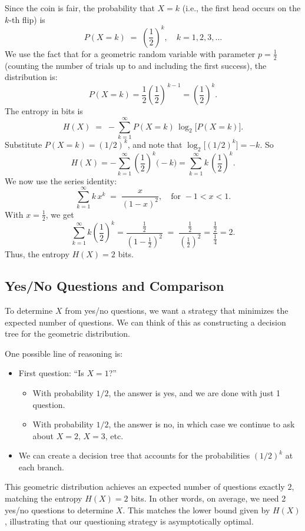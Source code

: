 \documentclass{article}
\begin{document}
Since the coin is fair, the probability that $X = k$ (i.e., the first head occurs on the $k$-th flip) is
\[
P(X = k) \;=\; \left(\frac12\right)^k,
\quad k = 1,2,3,\ldots
\]
We use the fact that for a geometric random variable with parameter $p=\tfrac12$ (counting the number of trials up to and including the first success), the distribution is:
\[
P(X = k) = \frac12 \left(\frac12\right)^{\,k-1} = \left(\frac12\right)^k.
\]
The entropy in bits is
\[
H(X) \;=\; - \sum_{k=1}^{\infty} P(X=k)\,\log_2 \bigl[P(X=k)\bigr].
\]
Substitute $P(X=k) = (1/2)^k$, and note that $\log_2 \bigl[ (1/2)^k \bigr] = -k$. So
\[
H(X)
= - \sum_{k=1}^{\infty} \left(\frac12\right)^k \bigl(-k\bigr)
= \sum_{k=1}^{\infty} k \,\left(\frac12\right)^k.
\]
We now use the series identity:
\[
\sum_{k=1}^{\infty} k \,x^k \;=\; \frac{x}{(1-x)^2}, 
\quad \text{for } -1 < x < 1.
\]
With $x = \tfrac12$, we get
\[
\sum_{k=1}^{\infty} k \left(\frac12\right)^k
= \frac{\tfrac12}{(1 - \tfrac12)^2} \;=\; \frac{\tfrac12}{(\tfrac12)^2} 
= \frac{\tfrac12}{\tfrac14} 
= 2.
\]
Thus, the entropy $H(X) = 2$ bits.

\subsection{Yes/No Questions and Comparison}

To determine $X$ from yes/no questions, we want a strategy that minimizes the expected number of questions. We can think of this as constructing a decision tree for the geometric distribution.

One possible line of reasoning is:
\begin{itemize}
    \item First question: ``Is $X=1$?'' 
        \begin{itemize}
        \item With probability $1/2$, the answer is yes, and we are done with just 1 question.
        \item With probability $1/2$, the answer is no, in which case we continue to ask about $X=2$, $X=3$, etc.
        \end{itemize}
    \item We can create a decision tree that accounts for the probabilities $(1/2)^k$ at each branch.
\end{itemize}
This geometric distribution achieves an expected number of questions exactly $2$, matching the entropy $H(X) = 2$ bits. In other words, on average, we need 2 yes/no questions to determine $X$. This matches the lower bound given by $H(X)$, illustrating that our questioning strategy is asymptotically optimal.
\end{document}

